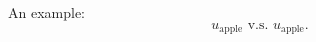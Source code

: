 \documentclass[12pt]{article}
\author{Pingbang Hu}
\begin{document}
\clearpage\maketitle
\thispagestyle{empty}

\newpage
\setcounter{page}{1}

An example:
\[
	u_{\text{apple}} \text{ v.s. } u_{\mathrm{apple}}.
\]
\end{document}
